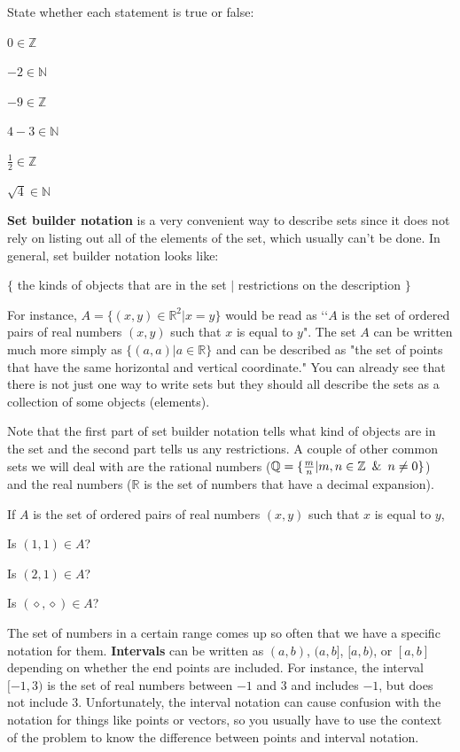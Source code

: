 \bq State whether each statement is true or false:
\be
\item $0 \in \mathbb{Z}$
\item $-2 \in \mathbb{N}$
\item $-9 \in \mathbb{Z}$
\item $4-3 \in \mathbb{N}$
\item $\frac{1}{2} \in \mathbb{Z}$
\item $\sqrt{4} \in \mathbb{N}$
\ee \eq

\begin{info}
\textbf{Set builder notation} is a very convenient way to describe sets since it does not rely on listing out all of the elements of the set, which usually can't be done. In general, set builder notation looks like:

$\{ $ the kinds of objects that are in the set $|$ restrictions on the description $\}$

For instance, $A=\{ (x,y) \in \mathbb{R}^2 | x=y\}$ would be read as \lq\lq{$A$ is the set of ordered pairs of real numbers $(x,y)$ such that $x$ is equal to $y$}". The set $A$ can be written much more simply as $\{(a,a)|a \in \mathbb{R} \}$ and can be described as "the set of points that have the same horizontal and vertical coordinate." You can already see that there is not just one way to write sets but they should all describe the sets as a collection of some objects (elements).

Note that the first part of set builder notation tells what kind of objects are in the set and the second part tells us any restrictions.
A couple of other common sets we will deal with are the rational numbers ($\mathbb{Q}=\{ \frac{m}{n} | m,n \in \mathbb{Z} \enskip \& \enskip  n \neq 0 \}$) and the real numbers ($\mathbb{R}$ is the set of numbers that have a decimal expansion).
\end{info}
\bq If $A$ is the set of ordered pairs of real numbers $(x,y)$ such that $x$ is equal to $y$,
\be
\item Is $(1,1)\in A$?
\item Is $(2,1)\in A$?
\item Is $(\diamond,\diamond) \in A$?
\ee \eq
\begin{info}
The set of numbers in a certain range comes up so often that we have a specific notation for them. \textbf{Intervals} can be written as $(a,b)$, $(a,b]$, $[a,b)$, or $[a,b]$ depending on whether the end points are included. For instance, the interval $[-1,3)$ is the set of real numbers between $-1$ and $3$ and includes $-1$, but does not include $3$. Unfortunately, the interval notation can cause confusion with the notation for things like points or vectors, so you usually have to use the context of the problem to know the difference between points and interval notation.

\end{info}

